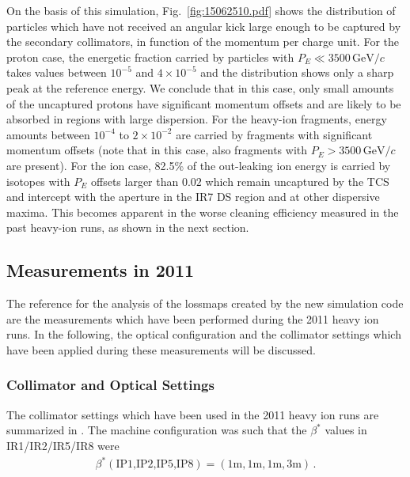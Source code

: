 

On the basis of this simulation, Fig.~\ref{fig:15062510.pdf} shows the distribution of particles which have not received an angular kick large enough to be captured by the secondary collimators, in function of the momentum per charge unit. For the proton case, the energetic fraction carried by particles with $P_E \ll 3500\,\text{GeV}/c$ takes values between $10^{-5}$ and $4 \times 10^{-5}$ and the distribution shows only a sharp peak at the reference energy. We conclude that in this case, only small amounts of the uncaptured protons have significant momentum offsets and are likely to be absorbed in regions with large dispersion. For the heavy-ion fragments, energy amounts between $10^{-4}$ to $2 \times 10^{-2}$ are carried by fragments with significant momentum offsets (note that in this case, also fragments with $P_E>3500\,\text{GeV}/c$ are present). For the ion case, 82.5\% of the out-leaking ion energy is carried by isotopes with $P_E$ offsets larger than $0.02$ which remain uncaptured by the TCS and intercept with the aperture in the IR7 DS region and at other dispersive maxima. This becomes apparent in the worse cleaning efficiency measured in the past heavy-ion runs, as shown in the next section.






\subsection{Measurements in 2011}
The reference for the analysis of the lossmaps created by the new simulation code are the measurements which have been performed during the 2011 heavy ion runs. In the following, the optical configuration and the collimator settings which have been applied during these measurements will be discussed.
\subsubsection{Collimator and Optical Settings}
The collimator settings which have been used in the 2011 heavy ion runs are summarized in . The machine configuration was such that the $\beta^*$ values in IR1/IR2/IR5/IR8 were
\begin{align}
\beta^*(\text{IP1,IP2,IP5,IP8}) = (1\text{m},1\text{m},1\text{m},3\text{m}) \, .
\end{align}



